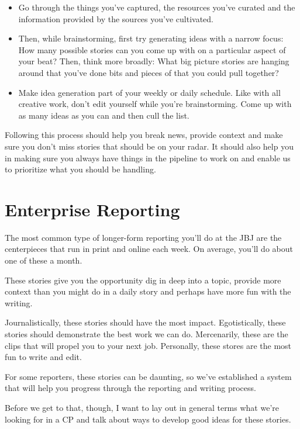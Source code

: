 \documentclass[
  12pt,
  american,
  letterpaperpaper,
  extrafontsizes,onecolumn,openright
  ]{memoir}
\providecommand{\tightlist}{%
  \setlength{\itemsep}{0pt}\setlength{\parskip}{0pt}}
\begin{document}
\begin{itemize}
  \begin{itemize}
  \tightlist
  \item
    Go through the things you've captured, the resources you've curated and the information provided by the sources you've cultivated.
  \item
    Then, while brainstorming, first try generating ideas with a narrow focus: How many possible stories can you come up with on a particular aspect of your beat? Then, think more broadly: What big picture stories are hanging around that you've done bits and pieces of that you could pull together?
  \item
    Make idea generation part of your weekly or daily schedule. Like with all creative work, don't edit yourself while you're brainstorming. Come up with as many ideas as you can and then cull the list.
  \end{itemize}
\end{itemize}

Following this process should help you break news, provide context and make sure you don't miss stories that should be on your radar. It should also help you in making sure you always have things in the pipeline to work on and enable us to prioritize what you should be handling.

\hypertarget{enterprise-reporting}{%
\chapter{Enterprise Reporting}\label{enterprise-reporting}}

The most common type of longer-form reporting you'll do at the JBJ are the centerpieces that run in print and online each week. On average, you'll do about one of these a month.

These stories give you the opportunity dig in deep into a topic, provide more context than you might do in a daily story and perhaps have more fun with the writing.

Journalistically, these stories should have the most impact. Egotistically, these stories should demonstrate the best work we can do. Mercenarily, these are the clips that will propel you to your next job. Personally, these stores are the most fun to write and edit.

For some reporters, these stories can be daunting, so we've established a system that will help you progress through the reporting and writing process.

Before we get to that, though, I want to lay out in general terms what we're looking for in a CP and talk about ways to develop good ideas for these stories.
\end{document}
